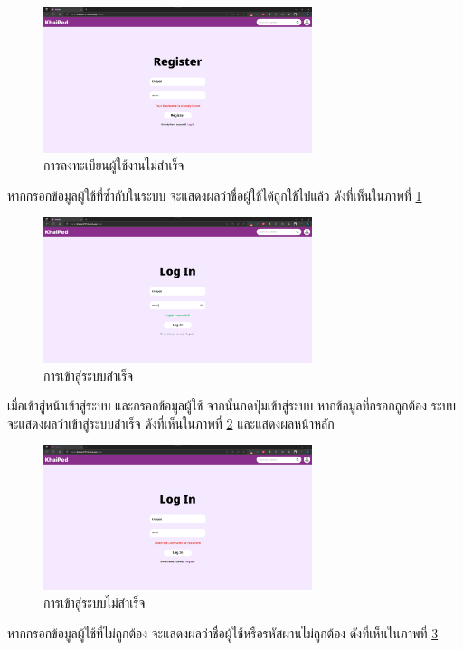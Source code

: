 \documentclass[12pt,oneside,openright,a4paper]{cpe-thai-project}
\begin{document}
\pagebreak
\begin{figure}[!h]\centering
	\includegraphics[width=0.7\textwidth, keepaspectratio=true]{image/chap4/UI/login/register failed.png}
	\caption{{การลงทะเบียนผู้ใช้งานไม่สำเร็จ}}\label{fig:chap4UIRegisterFailed}
\end{figure}
\hspace{1cm}
หากกรอกข้อมูลผู้ใช้ที่ซ้ำกับในระบบ จะแสดงผลว่าชื่อผู้ใช้ได้ถูกใช้ไปแล้ว ดังที่เห็นในภาพที่ \ref{fig:chap4UIRegisterFailed}

\begin{figure}[!h]\centering
	\includegraphics[width=0.7\textwidth, keepaspectratio=true]{image/chap4/UI/login/login success.png}
	\caption{{การเข้าสู่ระบบสำเร็จ}}\label{fig:chap4UILogInSuccess}
\end{figure}
\hspace{1cm}
เมื่อเข้าสู่หน้าเข้าสู่ระบบ และกรอกข้อมูลผู้ใช้ จากนั้นกดปุ่มเข้าสู่ระบบ หากข้อมูลที่กรอกถูกต้อง ระบบจะแสดงผลว่าเข้าสู่ระบบสำเร็จ
ดังที่เห็นในภาพที่ \ref{fig:chap4UILogInSuccess} และแสดงผลหน้าหลัก

\pagebreak
\begin{figure}[!h]\centering
	\includegraphics[width=0.7\textwidth, keepaspectratio=true]{image/chap4/UI/login/login failed.png}
	\caption{{การเข้าสู่ระบบไม่สำเร็จ}}\label{fig:chap4UILogInFailed}
\end{figure}
\hspace{1cm}
หากกรอกข้อมูลผู้ใช้ที่ไม่ถูกต้อง จะแสดงผลว่าชื่อผู้ใช้หรือรหัสผ่านไม่ถูกต้อง ดังที่เห็นในภาพที่ \ref{fig:chap4UILogInFailed}
\end{document}
